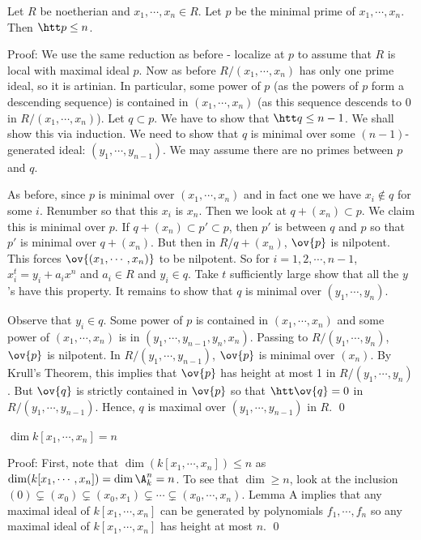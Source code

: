 \begin{thmm}
Let $R$ be noetherian and $x_1,\cdots,x_n \in R$. Let $p$ be the minimal prime of $x_1,\cdots,x_n$. Then $\htt p \leq n$. 
\end{thmm}

\noindent Proof: We use the same reduction as before - localize at $p$ to assume that $R$ is local with maximal ideal $p$. Now as before $R/(x_1,\cdots,x_n)$ has only one prime ideal, so it is artinian. In particular, some power of $p$ (as the powers of $p$ form a descending sequence) is contained in $(x_1,\cdots,x_n)$ (as this sequence descends to 0 in $R/(x_1,\cdots,x_n)$). Let $q \subset p$. We have to show that $\htt q \leq n-1$. We shall show this via induction. We need to show that $q$ is minimal over some $(n-1)$-generated ideal: $(y_1,\cdots,y_{n-1})$. We may assume there are no primes between $p$ and $q$. 

As before, since $p$ is minimal over $(x_1,\cdots,x_n)$ and in fact one we have $x_i \notin q$ for some $i$. Renumber so that this $x_i$ is $x_n$. Then we look at $q+(x_n) \subset p$. We claim this is minimal over $p$. If $q+(x_n) \subset p' \subset p$, then $p'$ is between $q$ and $p$ so that $p'$ is minimal over $q+(x_n)$. But then in $R/q+(x_n)$, $\ov{p}$ is nilpotent. This forces $\ov{(x_1,\cdots,x_n)}$ to be nilpotent. So for $i=1,2,\cdots,n-1$, $x_i^t=y_i+a_ix^n$ and $a_i \in R$ and $y_i \in q$. Take $t$ sufficiently large show that all the $y$'s have this property. It remains to show that $q$ is minimal over $(y_1,\cdots,y_n)$. 

Observe that $y_i \in q$. Some power of $p$ is contained in $(x_1,\cdots,x_n)$ and some power of $(x_1,\cdots,x_n)$ is in $(y_1,\cdots,y_{n-1},y_n,x_n)$. Passing to $R/(y_1,\cdots,y_n)$, $\ov{p}$ is nilpotent. In $R/(y_1,\cdots,y_{n-1})$, $\ov{p}$ is minimal over $(x_n)$. By Krull's Theorem, this implies that $\ov{p}$ has height at most 1 in $R/(y_1,\cdots,y_n)$. But $\ov{q}$ is strictly contained in $\ov{p}$ so that $\htt \ov{q}=0$ in $R/(y_1,\cdots,y_{n-1})$. Hence, $q$ is maximal over $(y_1,\cdots,y_{n-1})$ in $R$. \qed \\

\begin{cor}
$\dim k[x_1,\cdots,x_n]=n$
\end{cor}

\noindent Proof: First, note that $\dim(k[x_1,\cdots,x_n]) \leq n$ as $\dim(k[x_1,\cdots,x_n])=\dim \A_k^n=n$. To see that $\dim \geq n$, look at the inclusion $(0) \subsetneq (x_0) \subsetneq (x_0,x_1) \subsetneq \cdots \subsetneq (x_0,\cdots,x_n)$. Lemma A implies that any maximal ideal of $k[x_1,\cdots,x_n]$ can be generated by polynomials $f_1,\cdots,f_n$ so any maximal ideal of $k[x_1,\cdots,x_n]$ has height at most $n$. \qed \\

